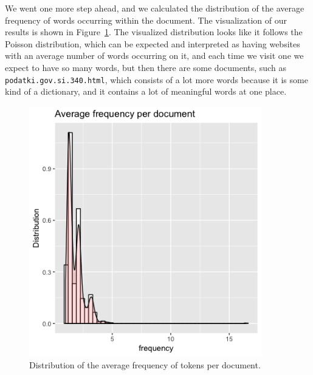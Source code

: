 \documentclass{article}
\begin{document}
	We went one more step ahead, and we calculated the distribution of the average frequency of words occurring within the document. The visualization of our results is shown in Figure~\ref{fig:1}. The visualized distribution looks like it follows the Poisson distribution, which can be expected and interpreted as having websites with an average number of words occurring on it, and each time we visit one we expect to have so many words, but then there are some documents, such as \texttt{podatki.gov.si.340.html}, which consists of a lot more words because it is some kind of a dictionary, and it contains a lot of meaningful words at one place.
	
	
	
	\begin{figure}
		\centering
		\includegraphics[width=0.9\textwidth]{avgFreq.png}
		\caption{Distribution of the average frequency of tokens per document.}
		\label{fig:1}
	\end{figure}
	
\end{document}
